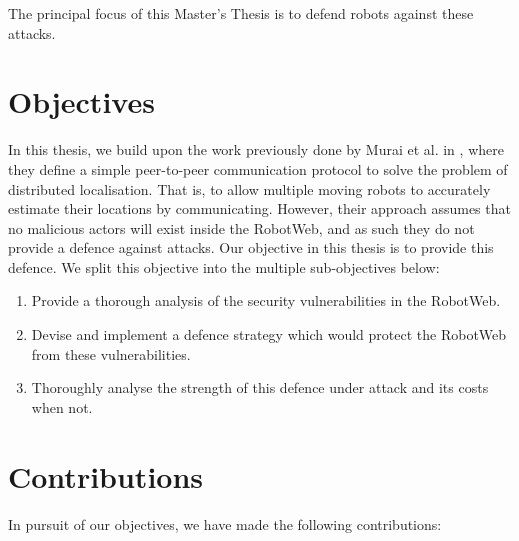 \begin{center}
    The principal focus of this Master's Thesis is to defend robots against these attacks.
\end{center}

\section{Objectives}
In this thesis, we build upon the work previously done by Murai et al. in \cite{Robotweb}, where they define a simple peer-to-peer communication protocol to solve the problem of distributed localisation. That is, to allow multiple moving robots to accurately estimate their locations by communicating. However, their approach assumes that no malicious actors will exist inside the RobotWeb, and as such they do not provide a defence against attacks. Our objective in this thesis is to provide this defence. We split this objective into the multiple sub-objectives below:
\begin{enumerate}
    \item Provide a thorough analysis of the security vulnerabilities in the RobotWeb.
    \item Devise and implement a defence strategy which would protect the RobotWeb from these vulnerabilities.
    \item Thoroughly analyse the strength of this defence under attack and its costs when not.
\end{enumerate}

\section{Contributions}
In pursuit of our objectives, we have made the following contributions:

